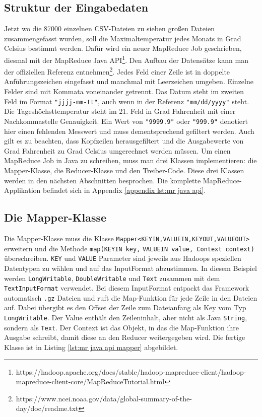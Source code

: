 \subsection{Struktur der Eingabedaten}
Jetzt wo die 87000 einzelnen CSV-Dateien zu sieben großen Dateien zusammengefasst wurden, soll die Maximaltemperatur jedes Monats in Grad Celsius bestimmt werden. Dafür wird ein neuer MapReduce Job geschrieben, diesmal mit der MapReduce Java API\footnote{https://hadoop.apache.org/docs/stable/hadoop-mapreduce-client/hadoop-mapreduce-client-core/MapReduceTutorial.html}. Den Aufbau der Datensätze kann man der offiziellen Referenz entnehmen\footnote{https://www.ncei.noaa.gov/data/global-summary-of-the-day/doc/readme.txt}. Jedes Feld einer Zeile ist in doppelte Anführungszeichen eingefasst und manchmal mit Leerzeichen umgeben. Einzelne Felder sind mit Kommata voneinander getrennt. Das Datum steht im zweiten Feld im Format \verb|"jjjj-mm-tt"|, auch wenn in der Referenz \verb|"mm/dd/yyyy"| steht. Die Tageshöchsttemperatur steht im 21. Feld in Grad Fahrenheit mit einer Nachkommastelle Genauigkeit. Ein Wert von \verb|"9999.9"| oder \verb|"999.9"| denotiert hier einen fehlenden Messwert und muss dementsprechend gefiltert werden. Auch gilt es zu beachten, dass Kopfzeilen herausgefiltert und die Ausgabewerte von Grad Fahrenheit zu Grad Celsius umgerechnet werden müssen. Um einen MapReduce Job in Java zu schreiben, muss man drei Klassen implementieren: die Mapper-Klasse, die Reducer-Klasse und den Treiber-Code. Diese drei Klassen werden in den nächsten Abschnitten besprochen. Die komplette MapReduce-Applikation befindet sich in Appendix \ref{appendix lst:mr java api}. 

\subsection{Die Mapper-Klasse}
Die Mapper-Klasse muss die Klasse \verb|Mapper<KEYIN,VALUEIN,KEYOUT,VALUEOUT>| erweitern und die Methode \verb|map(KEYIN key,| \verb|VALUEIN value, Context context)| überschreiben. \verb|KEY| und \verb|VALUE| Parameter sind jeweils aus Hadoops speziellen Datentypen zu wählen und auf das InputFormat abzustimmen. In diesem Beispiel werden \verb|LongWritable|, \verb|DoubleWritable| und \verb|Text| zusammen mit dem \verb|TextInputFormat| verwendet. Bei diesem InputFormat entpackt das Framework automatisch \verb|.gz| Dateien und ruft die Map-Funktion für jede Zeile in den Dateien auf. Dabei übergibt es den Offset der Zeile zum Dateianfang als Key vom Typ \verb|LongWritable|. Der Value enthält den Zeileninhalt, aber nicht als Java \verb|String|, sondern als \verb|Text|. Der Context ist das Objekt, in das die Map-Funktion ihre Ausgabe schreibt, damit diese an den Reducer weitergegeben wird. Die fertige Klasse ist in Listing \ref{lst:mr java api mapper} abgebildet.
\pagebreak

